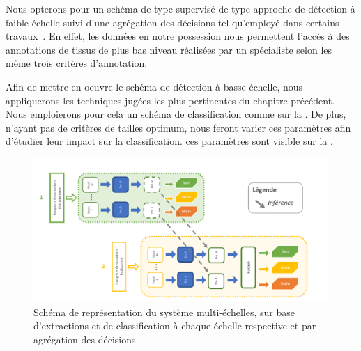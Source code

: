 Nous opterons pour un schéma de type supervisé de type approche de détection à faible échelle suivi d'une agrégation des décisions tel qu'employé dans certains travaux~\cite{Alqudah2019}. En effet, les données en notre possession nous permettent l'accès à des annotations de tissus de plus bas niveau réalisées par un spécialiste selon les même trois critères d'annotation.\par

Afin de mettre en oeuvre le schéma de détection à basse échelle, nous appliquerons les techniques jugées les plus pertinentes du chapitre précédent. Nous emploierons pour cela un schéma de classification comme sur la . De plus, n'ayant pas de critères de tailles optimum, nous feront varier ces paramètres afin d'étudier leur impact sur la classification. ces paramètres sont visible sur la .\par

\begin{figure}[H]
    \centering
    \includegraphics[width=\linewidth]{contents/chapter_5/resources/scheme_sliding_features.pdf}
    \caption{Schéma de représentation du système multi-échelles, sur base d'extractions et de classification à chaque échelle respective et par agrégation des décisions.}
    \label{fig:scheme_multiscale_decision}
\end{figure}\par

